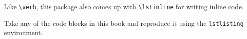 Like \texttt{\textbackslash verb}, this package also comes up with \texttt{\textbackslash lstinline} for writing inline code.

\begin{exercisebox}
\begin{Exercise}
Take any of the code blocks in this book and reproduce it using the \verb|lstlisting| environment.
\end{Exercise}
\end{exercisebox}